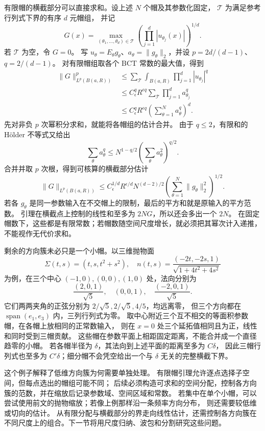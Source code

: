 \ProseParagraphBreak
有限帽的横截部分可以直接求和。设上述 \(N\) 个帽及其参数化固定，
\(\mathcal T\) 为满足参考行列式下界的有序 \(d\) 元帽组，
并记
\[
 G(x)=\max_{(\theta_1,\ldots,\theta_d)\in\mathcal T}
 \left(\prod_{j=1}^d|u_{\theta_j}(x)|\right)^{1/d}.
\]
若 \(\mathcal T\) 为空，令 \(G=0\)。
写 \(u_\theta=E_\theta g_\theta\)、\(a_\theta=\|g_\theta\|_2\)，并设
\(p=2d/(d-1)\)、\(q=2/(d-1)\)。
对有限帽组取各个 BCT 常数的最大值，得到
\[
 \begin{split}
 \|G\|_{L^p(B(a,R))}^p
 &\leq\sum_{\mathcal T}\int_{B(a,R)}
 \prod_{j=1}^d|u_{\theta_j}|^q\\
 &\leq C_\epsilon^qR^{\epsilon q}
 \sum_{\mathcal T}\prod_{j=1}^da_{\theta_j}^q\\
 &\leq C_\epsilon^qR^{\epsilon q}
 \left(\sum_{\theta=1}^Na_\theta^q\right)^d.
 \end{split}
\]
先对非负 \(p\) 次幂积分求和，就能将各帽组的估计合并。
由于 \(q\leq2\)，有限和的 Hölder 不等式又给出
\[
 \sum_\theta a_\theta^q
 \leq N^{1-q/2}
 \left(\sum_\theta a_\theta^2\right)^{q/2}.
\]
合并并取 \(p\) 次根，得到可核算的横截部分估计
\begin{equation}\label{b2:eq:25-cap-broad-bound}
 \|G\|_{L^p(B(a,R))}
 \leq C_\epsilon^{1/d}R^{\epsilon/d}
 N^{(d-2)/2}
 \left(\sum_{\theta=1}^N\|g_\theta\|_2^2\right)^{1/2}.
\end{equation}
若各 \(g_\theta\) 是同一参数输入在不交帽上的限制，最后的平方和就是原输入的平方范数。
引理在横截点上控制的线性和至多为 \(2NG\)，所以还会多出一个 \(2N\)。
在固定帽数下，这些都是有限常数；若帽数随空间尺度增长，就必须把其幂次计入递推，不能视作无代价求和。

\ProseParagraphBreak
剩余的方向簇未必只是一个小帽。以三维抛物面
\[
 \Sigma(t,s)=(t,s,t^2+s^2),\quad
 n(t,s)=\frac{(-2t,-2s,1)}{\sqrt{1+4t^2+4s^2}}
\]
为例，在三个中心 \((-1,0),(0,0),(1,0)\) 处，法向分别为
\[
 \frac{(2,0,1)}{\sqrt5},\quad (0,0,1),\quad
 \frac{(-2,0,1)}{\sqrt5}.
\]
它们两两夹角的正弦分别为 \(2/\sqrt5,2/\sqrt5,4/5\)，均远离零，
但三个方向都在 \(\operatorname{span}(e_1,e_3)\) 内，三列行列式为零。
取中心附近三个互不相交的等面积参数帽，在各帽上放相同的正常数输入，
则在 \(x=0\) 处三个延拓值相同且为正，线性和同时受到三帽贡献。
这些帽在参数平面上相距固定距离，不能合并成一个直径趋零的小帽。
若各帽半径为 \(\delta\)，其法向到上述平面的距离至多为 \(C\delta\)，
因此三帽行列式也至多为 \(C'\delta\)；细分帽不会凭空给出一个与 \(\delta\) 无关的完整横截下界。

这个例子解释了低维方向簇为何需要单独处理。
有限帽引理允许逐点选择子空间，但每点选出的帽组可能不同；
后续必须构造可求和的空间分配，控制各方向簇的范数，并在缩放后记录参数域、空间区域和常数。
若集中在单个小帽，可以尝试使用前文的抛物缩放；若像上例那样沿一条频率方向分布，
则还需要较低维或切向的估计。
从有限分配与横截部分的界走向线性估计，还需控制各方向簇在不同尺度上的组合。下一节将用尺度归纳、波包和分割研究这些问题。
